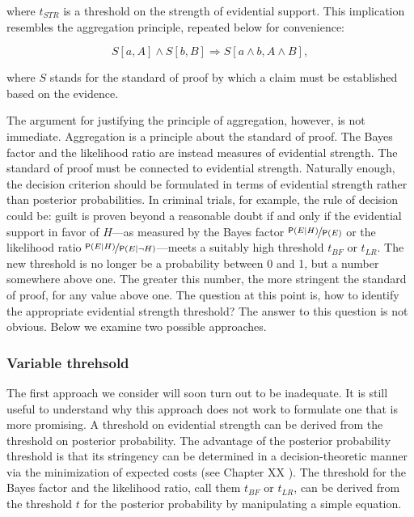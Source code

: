 \documentclass[
  10pt,
  dvipsnames,enabledeprecatedfontcommands]{scrartcl}
\newcommand{\n}{\neg}
\newcommand{\pr}[1]{\ensuremath{\mathsf{P}(#1)}}
\begin{document}
\noindent where \(t_{STR}\) is a threshold on the strength of evidential
support. This implication resembles the aggregation principle, repeated
below for convenience:

\[S[a, A] \wedge S[b, B] \Rightarrow  S[a \wedge b, A\wedge B],\]

\noindent  where \(S\) stands for the standard of proof by which a claim
must be established based on the evidence.

The argument for justifying the principle of aggregation, however, is
not immediate. Aggregation is a principle about the standard of proof.
The Bayes factor and the likelihood ratio are instead measures of
evidential strength. The standard of proof must be connected to
evidential strength. Naturally enough, the decision criterion should be
formulated in terms of evidential strength rather than posterior
probabilities. In criminal trials, for example, the rule of decision
could be: guilt is proven beyond a reasonable doubt if and only if the
evidential support in favor of \(H\)---as measured by the Bayes factor
\(\nicefrac{\pr{E \vert H}}{\pr{E}}\) or the likelihood ratio
\(\nicefrac{\pr{E\vert H}}{\pr{E \vert \n H}}\)---meets a suitably high
threshold \(t_{BF}\) or \(t_{LR}\). The new threshold is no longer be a
probability between 0 and 1, but a number somewhere above one. The
greater this number, the more stringent the standard of proof, for any
value above one. The question at this point is, how to identify the
appropriate evidential strength threshold? The answer to this question
is not obvious. Below we examine two possible approaches.

\hypertarget{variable-threhsold}{%
\subsubsection{Variable threhsold}\label{variable-threhsold}}

The first approach we consider will soon turn out to be inadequate. It
is still useful to understand why this approach does not work to
formulate one that is more promising. A threshold on evidential strength
can be derived from the threshold on posterior probability. The
advantage of the posterior probability threshold is that its stringency
can be determined in a decision-theoretic manner via the minimization of
expected costs (see Chapter XX ). The
threshold for the Bayes factor and the likelihood ratio, call them
\(t_{BF}\) or \(t_{LR}\), can be derived from the threshold \(t\) for
the posterior probability by manipulating a simple equation.
\end{document}
